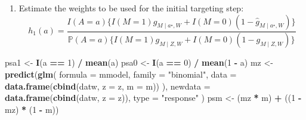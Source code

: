 \documentclass[
  12pt, krantz2,
]{book}
\makeatletter
\newenvironment{Shaded}{\begin{snugshade}}{\end{snugshade}}
\newcommand{\DataTypeTok}[1]{\textcolor[rgb]{0.13,0.29,0.53}{#1}}
\newcommand{\DecValTok}[1]{\textcolor[rgb]{0.00,0.00,0.81}{#1}}
\newcommand{\KeywordTok}[1]{\textcolor[rgb]{0.13,0.29,0.53}{\textbf{#1}}}
\newcommand{\NormalTok}[1]{#1}
\newcommand{\OperatorTok}[1]{\textcolor[rgb]{0.81,0.36,0.00}{\textbf{#1}}}
\newcommand{\StringTok}[1]{\textcolor[rgb]{0.31,0.60,0.02}{#1}}
\providecommand{\tightlist}{%
  \setlength{\itemsep}{0pt}\setlength{\parskip}{0pt}}
\newenvironment{kframe}{%
\medskip{}
\setlength{\fboxsep}{.8em}
 \def\at@end@of@kframe{}%
 \ifinner\ifhmode%
  \def\at@end@of@kframe{\end{minipage}}%
  \begin{minipage}{\columnwidth}%
 \fi\fi%
 \def\FrameCommand##1{\hskip\@totalleftmargin \hskip-\fboxsep
 \colorbox{shadecolor}{##1}\hskip-\fboxsep
     \hskip-\linewidth \hskip-\@totalleftmargin \hskip\columnwidth}%
 \MakeFramed {\advance\hsize-\width
   \@totalleftmargin\z@ \linewidth\hsize
   \@setminipage}}%
 {\par\unskip\endMakeFramed%
 \at@end@of@kframe}
\renewenvironment{Shaded}{\begin{kframe}}{\end{kframe}}
\theoremstyle{definition}
\theoremstyle{definition}
\theoremstyle{definition}
\renewcommand{\P}{\mathbb{P}}
\newcommand{\1}{\mathbbm{1}}
\makeatother
\begin{document}
\begin{enumerate}
\def\labelenumi{\arabic{enumi}.}
\setcounter{enumi}{4}
\tightlist
\item
  Estimate the weights to be used for the initial targeting step:
  \begin{equation*}
     h_1(a) = \frac{I(A=a)\{I(M=1)\hat{g}_{M \mid a^{\star}, W} +
       I(M=0)(1-\hat{g}_{M \mid a^{\star}, W}) \}}{\P(A=a)\{I(M=1)
       g_{M \mid Z,W} + I(M=0)(1-g_{M \mid Z,W}) \}}
  \end{equation*}
\end{enumerate}

\begin{Shaded}
\begin{Highlighting}[]
\NormalTok{psa1 <-}\StringTok{ }\KeywordTok{I}\NormalTok{(a }\OperatorTok{==}\StringTok{ }\DecValTok{1}\NormalTok{) }\OperatorTok{/}\StringTok{ }\KeywordTok{mean}\NormalTok{(a)}
\NormalTok{psa0 <-}\StringTok{ }\KeywordTok{I}\NormalTok{(a }\OperatorTok{==}\StringTok{ }\DecValTok{0}\NormalTok{) }\OperatorTok{/}\StringTok{ }\KeywordTok{mean}\NormalTok{(}\DecValTok{1} \OperatorTok{-}\StringTok{ }\NormalTok{a)}
\NormalTok{mz <-}\StringTok{ }\KeywordTok{predict}\NormalTok{(}\KeywordTok{glm}\NormalTok{(}
  \DataTypeTok{formula =}\NormalTok{ mmodel, }\DataTypeTok{family =} \StringTok{"binomial"}\NormalTok{,}
  \DataTypeTok{data =} \KeywordTok{data.frame}\NormalTok{(}\KeywordTok{cbind}\NormalTok{(datw, }\DataTypeTok{z =}\NormalTok{ z, }\DataTypeTok{m =}\NormalTok{ m))}
\NormalTok{),}
\DataTypeTok{newdata =} \KeywordTok{data.frame}\NormalTok{(}\KeywordTok{cbind}\NormalTok{(datw, }\DataTypeTok{z =}\NormalTok{ z)), }\DataTypeTok{type =} \StringTok{"response"}
\NormalTok{)}
\NormalTok{psm <-}\StringTok{ }\NormalTok{(mz }\OperatorTok{*}\StringTok{ }\NormalTok{m) }\OperatorTok{+}\StringTok{ }\NormalTok{((}\DecValTok{1} \OperatorTok{-}\StringTok{ }\NormalTok{mz) }\OperatorTok{*}\StringTok{ }\NormalTok{(}\DecValTok{1} \OperatorTok{-}\StringTok{ }\NormalTok{m))}


\end{Highlighting}
\end{Shaded}
\end{document}
